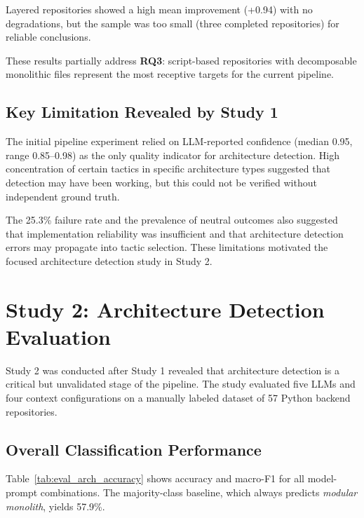 Layered repositories showed a high mean improvement (+0.94) with no degradations, but the sample was too small (three completed repositories) for reliable conclusions.

These results partially address \textbf{RQ3}: script-based repositories with decomposable monolithic files represent the most receptive targets for the current pipeline.

\subsection{Key Limitation Revealed by Study 1}
\label{subsec:eval_pipeline_limitation}

The initial pipeline experiment relied on LLM-reported confidence (median 0.95, range 0.85--0.98) as the only quality indicator for architecture detection. High concentration of certain tactics in specific architecture types suggested that detection may have been working, but this could not be verified without independent ground truth.

The 25.3\% failure rate and the prevalence of neutral outcomes also suggested that implementation reliability was insufficient and that architecture detection errors may propagate into tactic selection. These limitations motivated the focused architecture detection study in Study 2.

\section{Study 2: Architecture Detection Evaluation}
\label{sec:eval_arch_detection}

Study 2 was conducted after Study 1 revealed that architecture detection is a critical but unvalidated stage of the pipeline. The study evaluated five LLMs and four context configurations on a manually labeled dataset of 57 Python backend repositories.

\subsection{Overall Classification Performance}
\label{subsec:eval_arch_overall}

Table~\ref{tab:eval_arch_accuracy} shows accuracy and macro-F1 for all model-prompt combinations. The majority-class baseline, which always predicts \textit{modular monolith}, yields 57.9\%.

